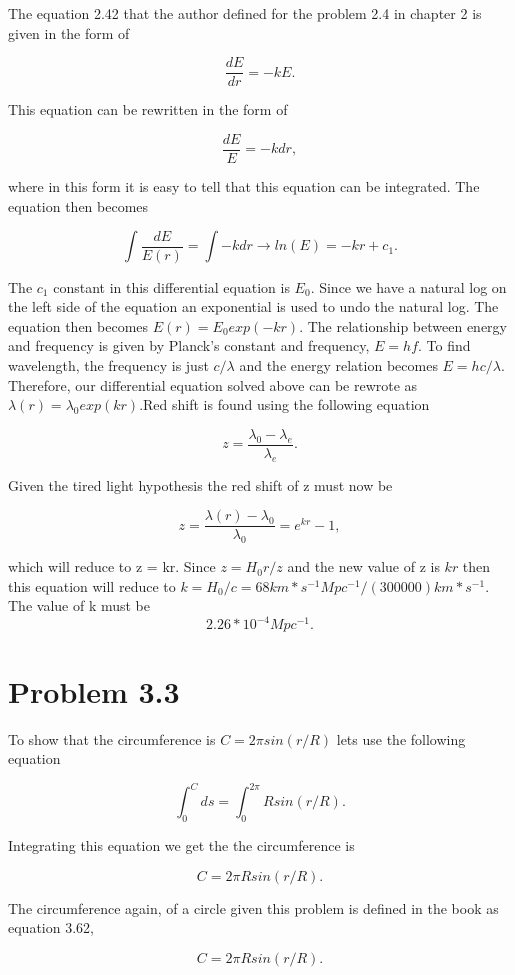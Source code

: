 \documentclass[12pt]{article}
\begin{document}
The equation 2.42 that the author defined for the problem 2.4 in chapter 2 is given in the form of

$$
\frac{dE}{dr} = -kE.
$$

This equation can be rewritten in the form of 

$$
\frac{dE}{E} = -kdr,
$$

where in this form it is easy to tell that this equation can be integrated. The equation then becomes

$$
\int \frac{dE}{E(r)} = \int -kdr \rightarrow ln(E) = -kr + c_{1}.
$$

The $c_{1}$ constant in this differential equation is $E_{0}$. Since we have a natural log on the left side of the equation an exponential is used to undo the natural log. The equation then becomes $E(r) = E_{0}exp(-kr)$. The relationship between energy and frequency is given by Planck's constant and frequency, $E = hf$. To find wavelength, the frequency is just $c/\lambda$ and the energy relation becomes $E = hc/\lambda$. Therefore, our differential equation solved above can be rewrote as $\lambda(r) = \lambda_{0}exp(kr)$.Red shift is found using the following equation

$$
z = \frac{\lambda_0 - \lambda_e}{\lambda_e}.
$$

Given the tired light hypothesis the red shift of z must now be

$$
z = \frac{\lambda(r) - \lambda_{0}}{\lambda_{0}} = e^{kr} - 1,
$$

which will reduce to z = kr. Since $z = H_{0} r/z$ and the new value of z is $kr$ then this equation will reduce to $k = H_{0}/c = 68 km*s^{-1} Mpc^{-1}/(300000) km*s^{-1}$. The value of k must be 
$$
2.26*10^{-4} Mpc^{-1}.
$$

\section*{Problem 3.3}

To show that the circumference is $C = 2\pi sin(r/R)$ lets use the following equation

$$
\int_{0}^{C} ds = \int_{0}^{2\pi} Rsin(r/R).
$$

Integrating this equation we get the the circumference is 

$$
C = 2\pi R sin(r/R).
$$

The circumference again, of a circle given this problem is defined in the book as equation 3.62,

$$
C = 2\pi R sin(r/R).
$$
\end{document}
